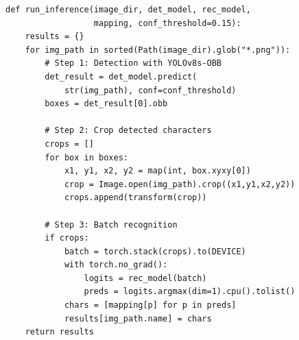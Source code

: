 \documentclass[12pt,a4paper]{article}
\begin{document}
\begin{lstlisting}[caption={端到端推理流程}]
def run_inference(image_dir, det_model, rec_model,
                  mapping, conf_threshold=0.15):
    results = {}
    for img_path in sorted(Path(image_dir).glob("*.png")):
        # Step 1: Detection with YOLOv8s-OBB
        det_result = det_model.predict(
            str(img_path), conf=conf_threshold)
        boxes = det_result[0].obb

        # Step 2: Crop detected characters
        crops = []
        for box in boxes:
            x1, y1, x2, y2 = map(int, box.xyxy[0])
            crop = Image.open(img_path).crop((x1,y1,x2,y2))
            crops.append(transform(crop))

        # Step 3: Batch recognition
        if crops:
            batch = torch.stack(crops).to(DEVICE)
            with torch.no_grad():
                logits = rec_model(batch)
                preds = logits.argmax(dim=1).cpu().tolist()
            chars = [mapping[p] for p in preds]
            results[img_path.name] = chars
    return results
\end{lstlisting}
\end{document}
